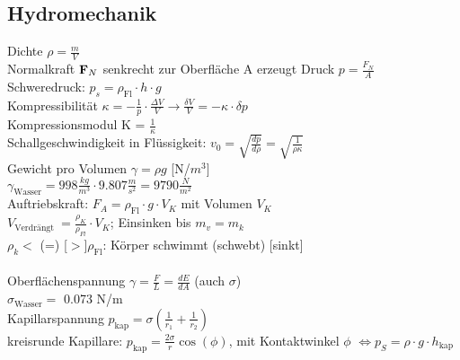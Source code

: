 \documentclass[fs, footer]{latex4ei}
\begin{document}
\begin{multicols*}{4}
\section{Hydromechanik}



Dichte $\rho = \frac{m}{V}$\\
Normalkraft $\textbf{F}_N$ senkrecht zur Oberfläche A erzeugt Druck $p = \frac{F_N}{A}$\\
Schweredruck: $p_s = \rho_{\text{Fl}}\cdot h\cdot g$\\
Kompressibilität $\kappa = -\frac{1}{p}\cdot \frac{\Delta V}{V} \rightarrow \frac{\delta V}{V}=-\kappa\cdot \delta p$\\
Kompressionsmodul K = $\frac{1}{\kappa}$\\
Schallgeschwindigkeit in Flüssigkeit: $v_0 = \sqrt{\frac{dp}{d\rho}} = \sqrt{\frac{1}{\rho\kappa}}$\\
Gewicht pro Volumen $\gamma = \rho g$ [N/$m^3$]\\
$\gamma_{\text{Wasser}} = 998\frac{kg}{m^3}\cdot 9.807\frac{m}{s^2} = 9790 \frac{N}{m^2}$\\
Auftriebskraft: $F_A = \rho_{\text{Fl}}\cdot g\cdot V_K$ mit Volumen $V_K$\\
$V_{\text{Verdrängt }} = \frac{\rho_K}{\rho_{Fl}}\cdot V_K$; Einsinken bis $m_v = m_k$\\
$\rho_k < $ (=) [$>$]$ \rho_{\text{Fl}}$: Körper schwimmt (schwebt) [sinkt]\\ %
\\
Oberflächenspannung $\gamma = \frac{F}{L} = \frac{dE}{dA}$ (auch $\sigma$)\\
$\sigma_{\text{Wasser}} =$ 0.073 N/m\\
Kapillarspannung $p_{\text{kap}} = \sigma(\frac{1}{r_1}+\frac{1}{r_2})$\\
kreisrunde Kapillare: $p_{\text{kap}} = \frac{2\sigma}{r}\cos (\phi)$, mit Kontaktwinkel $\phi$ $\Leftrightarrow p_S = \rho\cdot g\cdot h_{\text{kap}}$\\


\end{multicols*}
\end{document}
